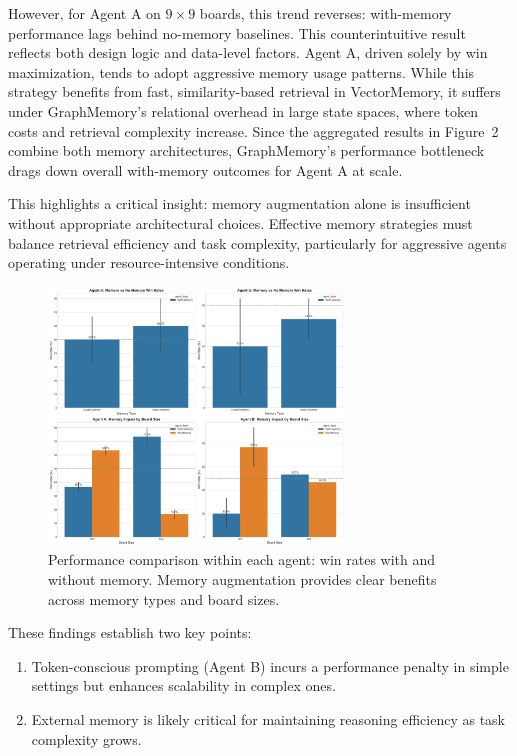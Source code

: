 \documentclass[10pt]{article}
\begin{document}
However, for Agent A on $9\times9$ boards, this trend reverses: with-memory performance lags behind no-memory baselines. This counterintuitive result reflects both design logic and data-level factors. Agent A, driven solely by win maximization, tends to adopt aggressive memory usage patterns. While this strategy benefits from fast, similarity-based retrieval in VectorMemory, it suffers under GraphMemory’s relational overhead in large state spaces, where token costs and retrieval complexity increase. Since the aggregated results in Figure~2 combine both memory architectures, GraphMemory’s performance bottleneck drags down overall with-memory outcomes for Agent A at scale.

This highlights a critical insight: memory augmentation alone is insufficient without appropriate architectural choices. Effective memory strategies must balance retrieval efficiency and task complexity, particularly for aggressive agents operating under resource-intensive conditions.

\begin{figure}[H]
\centering
\includegraphics[width=0.7\textwidth]{figures/memory_baseline/memory_baseline_comparison.png}
\caption{Performance comparison within each agent: win rates with and without memory. Memory augmentation provides clear benefits across memory types and board sizes.}
\label{fig:memory_baseline_comparison}
\end{figure}

These findings establish two key points: 
\begin{enumerate}[leftmargin=*,nosep]
    \item Token-conscious prompting (Agent B) incurs a performance penalty in simple settings but enhances scalability in complex ones.
    \item External memory is likely critical for maintaining reasoning efficiency as task complexity grows.
\end{enumerate}
\end{document}
